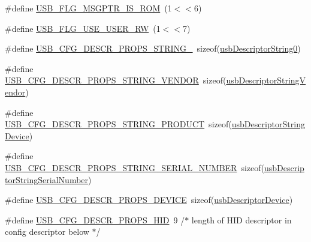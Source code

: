 \begin{DoxyCompactItemize}
\item 
\#define \hyperlink{mhvlib-_vusb-_keyboard_2vusb_2usbdrv_8c_a06db19dbad17d54fc6f3742ab0afba69}{U\-S\-B\-\_\-\-F\-L\-G\-\_\-\-M\-S\-G\-P\-T\-R\-\_\-\-I\-S\-\_\-\-R\-O\-M}~(1$<$$<$6)
\item 
\#define \hyperlink{mhvlib-_vusb-_keyboard_2vusb_2usbdrv_8c_ad2fe7ee90d3349e1399f61eda81d48e9}{U\-S\-B\-\_\-\-F\-L\-G\-\_\-\-U\-S\-E\-\_\-\-U\-S\-E\-R\-\_\-\-R\-W}~(1$<$$<$7)
\item 
\#define \hyperlink{mhvlib-_vusb-_keyboard_2vusb_2usbdrv_8c_a9c0556a4c6c5a1ab8f6598aee8e5bf6a}{U\-S\-B\-\_\-\-C\-F\-G\-\_\-\-D\-E\-S\-C\-R\-\_\-\-P\-R\-O\-P\-S\-\_\-\-S\-T\-R\-I\-N\-G\-\_}~sizeof(\hyperlink{mhvlib-_vusb-_console_2vusb_2usbdrv_8h_a367afe22c903b4b58805cc451c22cb99}{usb\-Descriptor\-String0})
\item 
\#define \hyperlink{mhvlib-_vusb-_keyboard_2vusb_2usbdrv_8c_a55edf2117128387162339d98ba2af0f4}{U\-S\-B\-\_\-\-C\-F\-G\-\_\-\-D\-E\-S\-C\-R\-\_\-\-P\-R\-O\-P\-S\-\_\-\-S\-T\-R\-I\-N\-G\-\_\-\-V\-E\-N\-D\-O\-R}~sizeof(\hyperlink{mhvlib-_vusb-_console_2vusb_2usbdrv_8h_aa92b0dfd57d302ff023bfb7ed868c2a1}{usb\-Descriptor\-String\-Vendor})
\item 
\#define \hyperlink{mhvlib-_vusb-_keyboard_2vusb_2usbdrv_8c_aa08084f9755a643e02d469b66b129ef6}{U\-S\-B\-\_\-\-C\-F\-G\-\_\-\-D\-E\-S\-C\-R\-\_\-\-P\-R\-O\-P\-S\-\_\-\-S\-T\-R\-I\-N\-G\-\_\-\-P\-R\-O\-D\-U\-C\-T}~sizeof(\hyperlink{mhvlib-_vusb-_console_2vusb_2usbdrv_8h_a1f252008bbf46a3172ebf8a4f8213a60}{usb\-Descriptor\-String\-Device})
\item 
\#define \hyperlink{mhvlib-_vusb-_keyboard_2vusb_2usbdrv_8c_a82224c07d3a1f9fcccbff70b71c8ea51}{U\-S\-B\-\_\-\-C\-F\-G\-\_\-\-D\-E\-S\-C\-R\-\_\-\-P\-R\-O\-P\-S\-\_\-\-S\-T\-R\-I\-N\-G\-\_\-\-S\-E\-R\-I\-A\-L\-\_\-\-N\-U\-M\-B\-E\-R}~sizeof(\hyperlink{mhvlib-_vusb-_console_2vusb_2usbdrv_8h_a97aa1ed300e711b6eabb5cef561313a3}{usb\-Descriptor\-String\-Serial\-Number})
\item 
\#define \hyperlink{mhvlib-_vusb-_keyboard_2vusb_2usbdrv_8c_aa916bf33f6f8f481a219d0a81b5b225e}{U\-S\-B\-\_\-\-C\-F\-G\-\_\-\-D\-E\-S\-C\-R\-\_\-\-P\-R\-O\-P\-S\-\_\-\-D\-E\-V\-I\-C\-E}~sizeof(\hyperlink{mhvlib-_vusb-_console_2vusb_2usbdrv_8h_a1b8593e30029ecfd59a89335a12db631}{usb\-Descriptor\-Device})
\item 
\#define \hyperlink{mhvlib-_vusb-_keyboard_2vusb_2usbdrv_8c_adfbd53b5310c36b1e4b06d6a3b992e8a}{U\-S\-B\-\_\-\-C\-F\-G\-\_\-\-D\-E\-S\-C\-R\-\_\-\-P\-R\-O\-P\-S\-\_\-\-H\-I\-D}~9   /$\ast$ length of H\-I\-D descriptor in config descriptor below $\ast$/

\end{DoxyCompactItemize}
